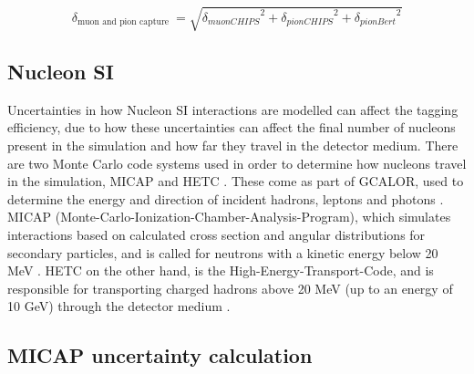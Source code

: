 \begin{equation}
    \delta_{\text {muon and pion capture }}=\sqrt{{\delta_{muon C H I P S}}^2 + {\delta_{pion C H I P S}}^2 + {\delta_{pion B e r t}}^2 }
\label{eq:total_mupicap_error}
\end{equation}


\subsection{Nucleon SI}
Uncertainties in how Nucleon SI interactions are modelled can affect the tagging efficiency, due to how these uncertainties can affect the final number of nucleons present in the simulation and how far they travel in the detector medium. There are two Monte Carlo code systems used in order to determine how nucleons travel in the simulation, MICAP and HETC \cite{micap_hetc}. These come as part of GCALOR, used to determine the energy and direction of incident hadrons, leptons and photons \cite{1998gcalor}. MICAP (Monte-Carlo-Ionization-Chamber-Analysis-Program), which simulates interactions based on calculated cross section and angular distributions for secondary particles, and is called for neutrons with a kinetic energy below 20 MeV \cite{Zeitnitz:1994bs}. HETC on the other hand, is the High-Energy-Transport-Code, and is responsible for transporting charged hadrons above 20 MeV (up to an energy of 10 GeV) through the detector medium \cite{gabrielhetc}. 

\subsection{MICAP uncertainty calculation}

